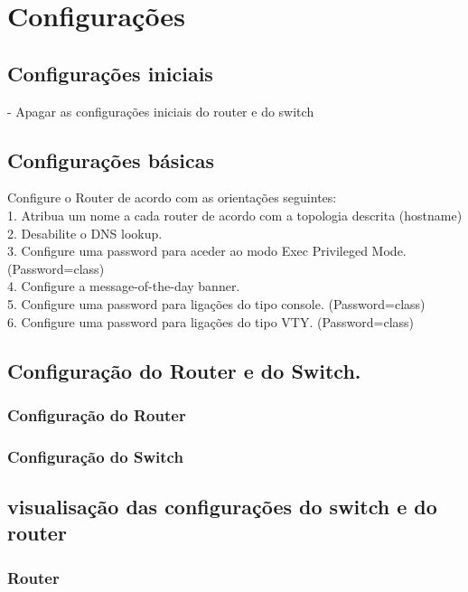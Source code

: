\documentclass[a4paper,titlepage]{article}
\begin{document}
	\section{Configurações}
			\subsection{Configurações iniciais}
				- Apagar as configurações iniciais do router e do switch\\
				
			\subsection{Configurações básicas}
						Configure o Router de acordo com as orientações seguintes:\\
						1. Atribua um nome a cada router de acordo com a topologia descrita (hostname)\\
						2. Desabilite o DNS lookup.\\
						3. Configure uma password para aceder ao modo Exec Privileged Mode.
						(Password=class)\\
						4. Configure a message-of-the-day banner.\\
						5. Configure uma password para ligações do tipo console. (Password=class)\\
						6. Configure uma password para ligações do tipo VTY. (Password=class)\\
					
						
			\subsection{Configuração do Router e do Switch.}
						\subsubsection{Configuração do Router}
							
						\subsubsection{Configuração do Switch}
							
			\subsection{visualisação das configurações do switch e do router}
						\subsubsection{Router}
							
\end{document}
